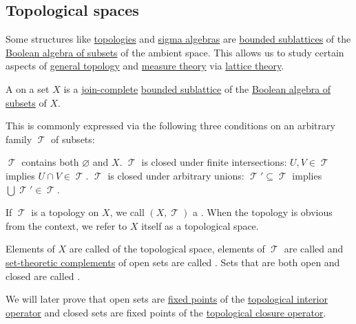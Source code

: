 \subsection{Topological spaces}\label{subsec:topological_spaces}

\begin{remark}\label{rem:topologies_and_sigma_algebras_as_lattices}
  Some structures like \hyperref[def:topological_space]{topologies} and \hyperref[def:sigma_algebra]{sigma algebras} are \hyperref[def:semilattice/submodel]{bounded sublattices} of the \hyperref[thm:boolean_algebra_of_subsets]{Boolean algebra of subsets} of the ambient space. This allows us to study certain aspects of \hyperref[sec:general_topology]{general topology} and \hyperref[sec:measure_theory]{measure theory} via \hyperref[subsec:lattices]{lattice theory}.
\end{remark}

\begin{definition}\label{def:topological_space}
  A  on a set \( X \) is a \hyperref[def:semilattice/lattice]{join-complete} \hyperref[def:semilattice/submodel]{bounded sublattice} of the \hyperref[thm:boolean_algebra_of_subsets]{Boolean algebra of subsets} of \( X \).

  This is commonly expressed via the following three conditions on an arbitrary family \( \mscrT \) of subsets:
  \begin{thmenum}
     \( \mscrT \) contains both \( \varnothing \) and \( X \).
     \( \mscrT \) is closed under finite intersections: \( U, V \in \mscrT \) implies \( U \cap V \in \mscrT \).
     \( \mscrT \) is closed under arbitrary unions: \( \mscrT' \subseteq \mscrT \) implies \( \bigcup \mscrT' \in \mscrT \).
  \end{thmenum}

  If \( \mscrT \) is a topology on \( X \), we call \( (X, \mscrT) \) a . When the topology is obvious from the context, we refer to \( X \) itself as a topological space.

  Elements of \( X \) are called  of the topological space, elements of \( \mscrT \) are called  and \hyperref[thm:boolean_algebra_of_subsets/complement]{set-theoretic complements} of open sets are called . Sets that are both open and closed are called .
\end{definition}
\begin{comments}
  \item We will later prove that open sets are \hyperref[def:fixed_point]{fixed points} of the \hyperref[def:topological_interior_operator]{topological interior operator} and closed sets are fixed points of the \hyperref[def:topological_closure_operator]{topological closure operator}.
\end{comments}

